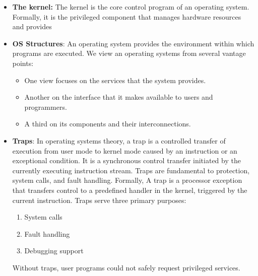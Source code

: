 \documentclass{report}
\begin{document}
    \begin{itemize}
        \item \textbf{The kernel:} The kernel is the core control program of an operating system. Formally, it is the privileged component that manages hardware resources and provides
        \item \textbf{OS Structures}: An operating system provides the environment within which programs are executed. We view an operating systems from several vantage points:
            \begin{itemize}
                \item One view focuses on the services that the system provides.
                \item Another on the interface that it makes available to users and programmers.
                \item A third on its components and their interconnections.
            \end{itemize}
                    \item \textbf{Traps}: In operating systems theory, a trap is a controlled transfer of execution from user mode to kernel mode caused by an instruction or an exceptional condition. It is a synchronous control transfer initiated by the currently executing instruction stream. Traps are fundamental to protection, system calls, and fault handling.
            \bigbreak \noindent 
            Formally, A trap is a processor exception that transfers control to a predefined handler in the kernel, triggered by the current instruction.
            \bigbreak \noindent 
            Traps serve three primary purposes:
            \begin{enumerate}
                \item System calls
                \item Fault handling
                \item Debugging support
            \end{enumerate}
            Without traps, user programs could not safely request privileged services.


\end{itemize}
\end{document}
